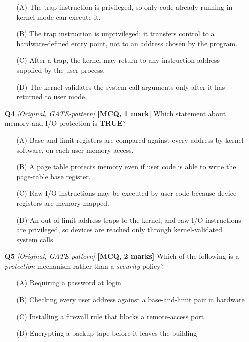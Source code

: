 \documentclass[11pt]{article}
\begin{document}
\begin{enumerate}
\begin{enumerate}
  \item[(A)] The trap instruction is privileged, so only code already running in kernel mode can execute it.
  \item[(B)] The trap instruction is unprivileged; it transfers control to a hardware-defined entry point, not to an address chosen by the program.
  \item[(C)] After a trap, the kernel may return to any instruction address supplied by the user process.
  \item[(D)] The kernel validates the system-call arguments only after it has returned to user mode.
\end{enumerate}

\item[\textbf{Q4}] \textit{[Original, GATE-pattern]} \textbf{[MCQ, 1 mark]} Which statement about memory and I/O protection is \textbf{TRUE}?

\begin{enumerate}
  \item[(A)] Base and limit registers are compared against every address by kernel software, on each user memory access.
  \item[(B)] A page table protects memory even if user code is able to write the page-table base register.
  \item[(C)] Raw I/O instructions may be executed by user code because device registers are memory-mapped.
  \item[(D)] An out-of-limit address traps to the kernel, and raw I/O instructions are privileged, so devices are reached only through kernel-validated system calls.
\end{enumerate}

\item[\textbf{Q5}] \textit{[Original, GATE-pattern]} \textbf{[MCQ, 2 marks]} Which of the following is a \emph{protection} mechanism rather than a \emph{security} policy?

\begin{enumerate}
  \item[(A)] Requiring a password at login
  \item[(B)] Checking every user address against a base-and-limit pair in hardware
  \item[(C)] Installing a firewall rule that blocks a remote-access port
  \item[(D)] Encrypting a backup tape before it leaves the building
\end{enumerate}


\end{enumerate}
\end{document}
